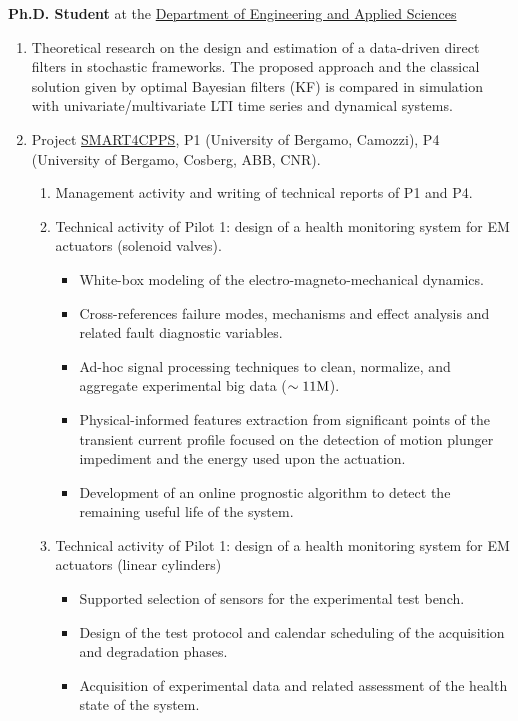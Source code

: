 \documentclass[10pt]{article}
\begin{document}
\begin{minipage}[t]{.80\textwidth}
	\textbf{Ph.D. Student} at the \href{https://disa.unibg.it/}{Department of Engineering and Applied Sciences}
	\begin{enumerate}
		\item Theoretical research on the design and estimation of a data-driven direct filters in stochastic frameworks.
		The proposed approach and the classical solution given by optimal Bayesian filters (KF) is compared in simulation with univariate/multivariate LTI time series and dynamical systems.
		\item Project \href{https://www.smart4cpps.it/}{SMART4CPPS}, P1 ({\small University of Bergamo, Camozzi}), P4 ({\small University of Bergamo, Cosberg, ABB, CNR}).
		\begin{enumerate}
			\item Management activity and writing of technical reports of P1 and P4.
			\item Technical activity of Pilot 1: design of a health monitoring system for EM actuators (solenoid valves).
			\begin{itemize}
				\item White-box modeling of the electro-magneto-mechanical dynamics.
				\item Cross-references failure modes, mechanisms and effect analysis and related fault diagnostic variables.
				\item Ad-hoc signal processing techniques to clean, normalize, and aggregate experimental big data ($\sim 11 \textnormal{M}$).
				\item Physical-informed features extraction from significant points of the transient current profile focused on the detection of motion plunger impediment and the energy used upon the actuation.
				\item Development of an online prognostic algorithm to detect the remaining useful life of the system.
			\end{itemize}
			\item Technical activity of Pilot 1: design of a health monitoring system for EM actuators (linear cylinders)
			\begin{itemize}
				\item Supported selection of sensors for the experimental test bench.
				\item Design of the test protocol and calendar scheduling of the acquisition and degradation phases.
				\item Acquisition of experimental data and related assessment of the health state of the system.

\end{itemize}
\end{enumerate}
\end{enumerate}
\end{minipage}
\end{document}
